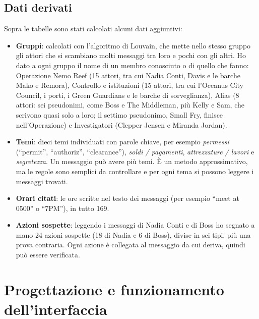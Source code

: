\documentclass[11pt,a4paper]{article}
\begin{document}
\subsection{Dati derivati}
Sopra le tabelle sono stati calcolati alcuni dati aggiuntivi:
\begin{itemize}
  \item \textbf{Gruppi}: calcolati con l'algoritmo di Louvain, che mette nello stesso gruppo gli attori che
        si scambiano molti messaggi tra loro e pochi con gli altri. Ho dato a ogni gruppo il nome di un membro
        conosciuto o di quello che fanno:
        Operazione Nemo Reef (15 attori, tra cui Nadia Conti, Davis e le barche Mako e Remora), Controllo e
        istituzioni (15 attori, tra cui l'Oceanus City Council, i porti, i Green Guardians e le barche di
        sorveglianza), Alias (8 attori: sei pseudonimi, come Boss e The Middleman, più Kelly e Sam, che scrivono
        quasi solo a loro; il settimo pseudonimo, Small Fry, finisce nell'Operazione) e Investigatori (Clepper Jensen e Miranda Jordan).
  \item \textbf{Temi}: dieci temi individuati con parole chiave, per esempio \emph{permessi} (``permit'',
        ``authoriz'', ``clearance''), \emph{soldi / pagamenti}, \emph{attrezzature / lavori} e
        \emph{segretezza}. Un messaggio può avere più temi. È un metodo approssimativo, ma le regole sono
        semplici da controllare e per ogni tema si possono leggere i messaggi trovati.
  \item \textbf{Orari citati}: le ore scritte nel testo dei messaggi (per esempio ``meet at 0500'' o
        ``7PM''), in tutto 169.
  \item \textbf{Azioni sospette}: leggendo i messaggi di Nadia Conti e di Boss ho segnato a mano 24 azioni
        sospette (18 di Nadia e 6 di Boss), divise in sei tipi, più una prova contraria. Ogni azione è collegata
        al messaggio da cui deriva, quindi può essere verificata.
\end{itemize}

\section{Progettazione e funzionamento dell'interfaccia}
\end{document}
